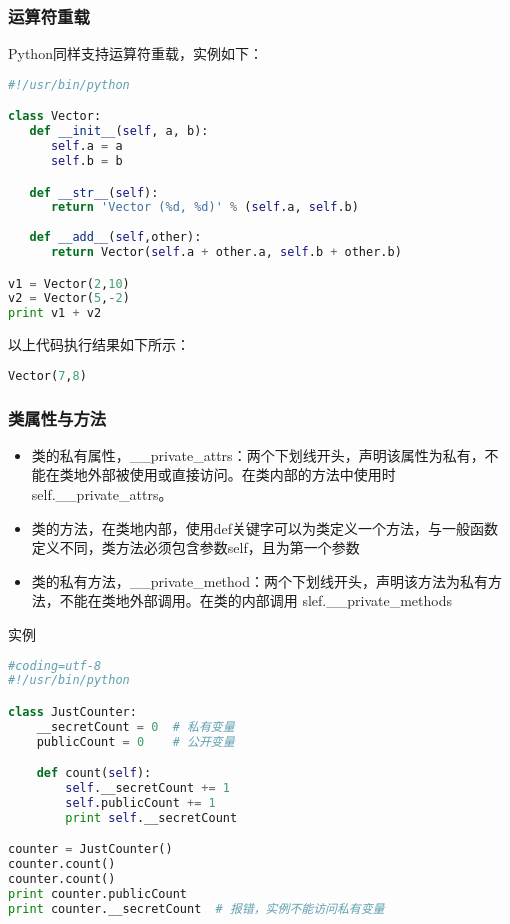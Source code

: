 \subsubsection{运算符重载}
Python同样支持运算符重载，实例如下：
\begin{lstlisting}[language=Python]
#!/usr/bin/python

class Vector:
   def __init__(self, a, b):
      self.a = a
      self.b = b

   def __str__(self):
      return 'Vector (%d, %d)' % (self.a, self.b)
   
   def __add__(self,other):
      return Vector(self.a + other.a, self.b + other.b)

v1 = Vector(2,10)
v2 = Vector(5,-2)
print v1 + v2
\end{lstlisting}
以上代码执行结果如下所示：
\begin{lstlisting}[language=Python]
Vector(7,8)
\end{lstlisting}



\subsubsection{类属性与方法}
\begin{itemize}
\item 类的私有属性，\_\_private\_attrs：两个下划线开头，声明该属性为私有，不能在类地外部被使用或直接访问。在类内部的方法中使用时 self.\_\_private\_attrs。

\item 类的方法，在类地内部，使用def关键字可以为类定义一个方法，与一般函数定义不同，类方法必须包含参数self，且为第一个参数

\item 类的私有方法，\_\_private\_method：两个下划线开头，声明该方法为私有方法，不能在类地外部调用。在类的内部调用 slef.\_\_private\_methods
\end{itemize}

实例
\begin{lstlisting}[language=Python]
#coding=utf-8
#!/usr/bin/python

class JustCounter:
	__secretCount = 0  # 私有变量
	publicCount = 0    # 公开变量

	def count(self):
		self.__secretCount += 1
		self.publicCount += 1
		print self.__secretCount

counter = JustCounter()
counter.count()
counter.count()
print counter.publicCount
print counter.__secretCount  # 报错，实例不能访问私有变量
\end{lstlisting}

